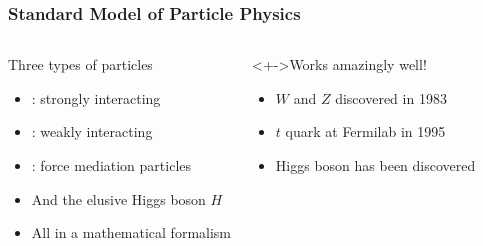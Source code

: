\begin{frame}[t]
 \frametitle{Standard Model of Particle Physics}
 \begin{columns}
   \begin{block}{Three types of particles}
    \begin{itemize}
     \item<2-> : strongly interacting
     \item<3-> : weakly interacting
     \item<4-> : force mediation particles
     \item<5-> And the elusive Higgs boson \boldmath$H$
     \item<5-> All in a mathematical formalism
    \end{itemize}
   \end{block}
   \begin{block}<+->{Works amazingly well!}
    \begin{itemize}
     \item $W$ and $Z$ discovered in 1983
     \item $t$ quark at Fermilab in 1995
     \item \alert<+->{Higgs boson has been discovered}
    \end{itemize}
   \end{block}
 \end{columns}
\end{frame}
